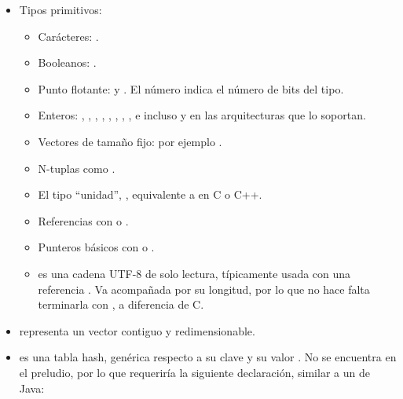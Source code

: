 \begin{itemize}
    \item Tipos primitivos:
        \begin{itemize}
            \item Carácteres: .

            \item Booleanos: .

            \item Punto flotante:  y . El número indica el
                número de bits del tipo.

            \item Enteros: , , , ,
                , , , , e incluso
                 y  en las arquitecturas que lo soportan.

            \item Vectores de tamaño fijo: por ejemplo \rust{[1, 2, 3, 4, 5]}.

            \item N-tuplas como .

            \item El tipo ``unidad'', \rust{()}, equivalente a  en C
                o C++.

            \item Referencias con  o .

            \item Punteros básicos con  o .

            \item {} es una cadena UTF-8 de solo lectura, típicamente
                usada con una referencia . Va acompañada por su
                longitud, por lo que no hace falta terminarla con \code{\0}, a
                diferencia de C.

        \end{itemize}

    \item {} representa un vector contiguo y redimensionable.

    \item {} es una tabla hash, genérica respecto a su clave
         y su valor . No se encuentra en el preludio, por lo que
        requeriría la siguiente declaración, similar a un  de Java:


\end{itemize}
